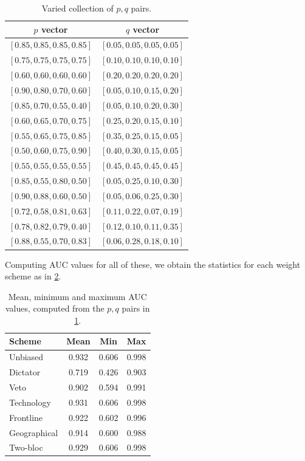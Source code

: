 \begin{table}[h!]
\centering
\begin{tabular}{c c}
\hline
\textbf{$p$ vector} & \textbf{$q$ vector} \\
\hline
$[0.85, 0.85, 0.85, 0.85]$ & $[0.05, 0.05, 0.05, 0.05]$ \\
$[0.75, 0.75, 0.75, 0.75]$ & $[0.10, 0.10, 0.10, 0.10]$ \\
$[0.60, 0.60, 0.60, 0.60]$ & $[0.20, 0.20, 0.20, 0.20]$ \\
$[0.90, 0.80, 0.70, 0.60]$ & $[0.05, 0.10, 0.15, 0.20]$ \\
$[0.85, 0.70, 0.55, 0.40]$ & $[0.05, 0.10, 0.20, 0.30]$ \\
$[0.60, 0.65, 0.70, 0.75]$ & $[0.25, 0.20, 0.15, 0.10]$ \\
$[0.55, 0.65, 0.75, 0.85]$ & $[0.35, 0.25, 0.15, 0.05]$ \\
$[0.50, 0.60, 0.75, 0.90]$ & $[0.40, 0.30, 0.15, 0.05]$ \\
$[0.55, 0.55, 0.55, 0.55]$ & $[0.45, 0.45, 0.45, 0.45]$ \\
$[0.85, 0.55, 0.80, 0.50]$ & $[0.05, 0.25, 0.10, 0.30]$ \\
$[0.90, 0.88, 0.60, 0.50]$ & $[0.05, 0.06, 0.25, 0.30]$ \\
$[0.72, 0.58, 0.81, 0.63]$ & $[0.11, 0.22, 0.07, 0.19]$ \\
$[0.78, 0.82, 0.79, 0.40]$ & $[0.12, 0.10, 0.11, 0.35]$ \\
$[0.88, 0.55, 0.70, 0.83]$ & $[0.06, 0.28, 0.18, 0.10]$ \\
\hline
\end{tabular}
\caption{Varied collection of $p, q$ pairs.}
\label{table:p-q-vectors}
\end{table}

Computing AUC values for all of these, we obtain the statistics for each weight scheme as in \cref{table:AUC-statistics}. 

\begin{table}[h!]
\centering
\begin{tabular}{lccc}
\hline
\textbf{Scheme} & \textbf{Mean} & \textbf{Min} & \textbf{Max} \\
\hline
Unbiased     & 0.932 & 0.606 & 0.998 \\
Dictator     & 0.719 & 0.426 & 0.903 \\
Veto         & 0.902 & 0.594 & 0.991 \\
Technology   & 0.931 & 0.606 & 0.998 \\
Frontline    & 0.922 & 0.602 & 0.996 \\
Geographical & 0.914 & 0.600 & 0.988 \\
Two-bloc     & 0.929 & 0.606 & 0.998 \\
\hline
\end{tabular}
\caption{Mean, minimum and maximum AUC values, computed from the $p,q$ pairs in \cref{table:p-q-vectors}.}
\label{table:AUC-statistics}
\end{table}

